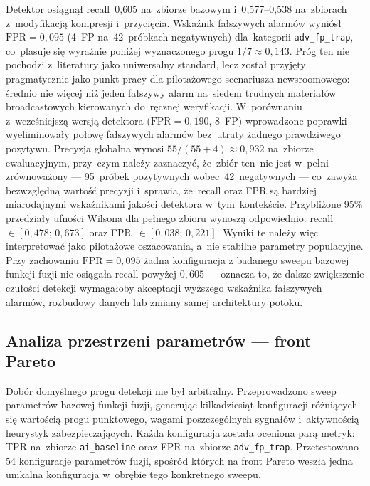 Detektor osiągnął recall~0{,}605 na~zbiorze bazowym
i~0{,}577--0{,}538 na~zbiorach z~modyfikacją kompresji i~przycięcia.
Wskaźnik fałszywych alarmów wyniósł $\mathrm{FPR} = 0{,}095$
(4~FP na~42~próbkach negatywnych) dla~kategorii \texttt{adv\_fp\_trap},
co~plasuje się wyraźnie poniżej wyznaczonego progu $1/7 \approx 0{,}143$.
Próg ten nie pochodzi z~literatury jako uniwersalny standard, lecz został
przyjęty pragmatycznie jako punkt pracy dla pilotażowego scenariusza newsroomowego:
średnio nie więcej niż jeden fałszywy alarm na~siedem trudnych materiałów
broadcastowych kierowanych do~ręcznej weryfikacji.
W~porównaniu z~wcześniejszą wersją detektora ($\mathrm{FPR} = 0{,}190$, 8~FP)
wprowadzone poprawki wyeliminowały połowę fałszywych alarmów
bez~utraty żadnego prawdziwego pozytywu.
Precyzja globalna wynosi $55/(55+4) \approx 0{,}932$ na~zbiorze ewaluacyjnym,
przy~czym należy zaznaczyć, że~zbiór ten~nie jest w~pełni zrównoważony
--- 95~próbek pozytywnych wobec~42~negatywnych --- co~zawyża bezwzględną
wartość precyzji i~sprawia, że~recall oraz FPR są bardziej miarodajnymi
wskaźnikami jakości detektora w~tym~kontekście. Przybliżone 95\% przedziały
ufności Wilsona dla pełnego zbioru wynoszą odpowiednio:
recall~$\in [0{,}478;\,0{,}673]$ oraz FPR~$\in [0{,}038;\,0{,}221]$.
Wyniki te należy więc interpretować jako pilotażowe oszacowania, a~nie
stabilne parametry populacyjne. Przy zachowaniu $\text{FPR} = 0{,}095$
żadna konfiguracja z badanego sweepu bazowej funkcji fuzji nie osiągała
recall powyżej $0{,}605$ --- oznacza to, że dalsze zwiększenie czułości
detekcji wymagałoby akceptacji wyższego wskaźnika fałszywych alarmów,
rozbudowy danych lub zmiany samej architektury potoku.

\subsection*{Analiza przestrzeni parametrów --- front Pareto}

Dobór domyślnego progu detekcji nie był arbitralny. Przeprowadzono
sweep parametrów bazowej funkcji fuzji, generując kilkadziesiąt
konfiguracji różniących się wartością progu punktowego, wagami
poszczególnych sygnałów i~aktywnością heurystyk zabezpieczających.
Każda konfiguracja została oceniona parą metryk: TPR na~zbiorze
\texttt{ai\_baseline} oraz FPR na~zbiorze \texttt{adv\_fp\_trap}.
Przetestowano 54 konfiguracje parametrów fuzji, spośród których na front Pareto
weszła jedna unikalna konfiguracja w~obrębie tego konkretnego sweepu.

